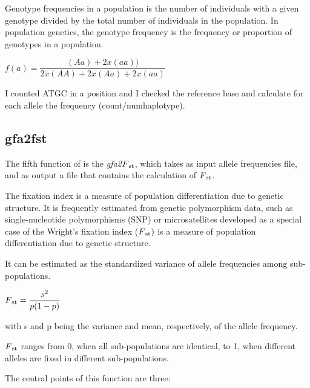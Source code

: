 Genotype frequencies \cite{brooker2014principles} in a population is the number of individuals with a given genotype divided by the total number of individuals in the population. In population genetics, the genotype frequency is the frequency or proportion of genotypes in a population. 

$f(a) = \dfrac{(Aa) + 2 x (aa))}{2 x (AA) + 2 x (Aa) + 2 x (aa)}$

I counted ATGC in a position and I checked the reference base and calculate for each allele the frequency (count/numhaplotype).




\subsection{gfa2fst}

The fifth function of \vgp is the \textit{gfa2$F\textsubscript{st}$}, which takes as input allele frequencies file, and as output a file that contains the calculation of $F\textsubscript{st}$.

The fixation index is a measure of population differentiation due to genetic structure. It is frequently estimated from genetic polymorphism data, such as single-nucleotide polymorphisms (SNP) or microsatellites developed as a special case of
the Wright’s fixation index ($F\textsubscript{st})$ is a measure of population differentiation due to genetic structure. 

It can be estimated as the standardized variance of allele frequencies among sub-populations.

$F\textsubscript{st} = \dfrac{s^{2}}{p(1-p)}$

with s and p being the variance and mean, respectively, of the allele frequency. 

$F\textsubscript{st}$ \cite{barbujani2010human} ranges from 0, when all sub-populations are identical, to 1, when different alleles are fixed in different sub-populations.


The central points of this function are three:



